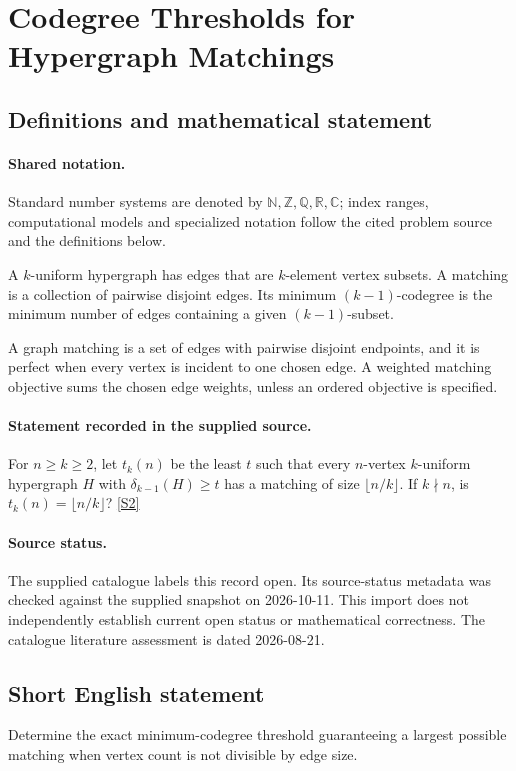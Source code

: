 \documentclass[11pt]{article}
\newcommand{\sref}[2]{\hyperlink{source:#1:#2}{[S#2]}}
\begin{document}
\section{Codegree Thresholds for Hypergraph Matchings}\label{statement}

\subsection{Definitions and mathematical statement}

\paragraph{Shared notation.}Standard number systems are denoted by $\mathbb N,\mathbb Z,\mathbb Q,\mathbb R,\mathbb C$; index ranges, computational models and specialized notation follow the cited problem source and the definitions below.


A $k$-uniform hypergraph has edges that are $k$-element vertex subsets. A matching is a collection of pairwise disjoint edges. Its minimum $(k-1)$-codegree is the minimum number of edges containing a given $(k-1)$-subset.

A graph matching is a set of edges with pairwise disjoint endpoints, and it is perfect when every vertex is incident to one chosen edge. A weighted matching objective sums the chosen edge weights, unless an ordered objective is specified.
\paragraph{Statement recorded in the supplied source.}
For $n\geq k\geq2$, let $t_k(n)$ be the least $t$ such that every $n$-vertex $k$-uniform hypergraph $H$ with $\delta_{k-1}(H)\geq t$ has a matching of size $\lfloor n/k\rfloor$. If $k\nmid n$, is $t_k(n)=\lfloor n/k\rfloor$? \sref{statement}{2}
\paragraph{Source status.}
The supplied catalogue labels this record open. Its source-status metadata was checked against the supplied snapshot on 2026-10-11. This import does not independently establish current open status or mathematical correctness. The catalogue literature assessment is dated 2026-08-21.
\subsection{Short English statement}
Determine the exact minimum-codegree threshold guaranteeing a largest possible matching when vertex count is not divisible by edge size.
\end{document}
